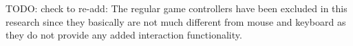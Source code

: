 TODO: check to re-add:
 The regular game controllers have been excluded in this research since they basically are not much different from mouse and keyboard as they do not provide any added interaction functionality.

















